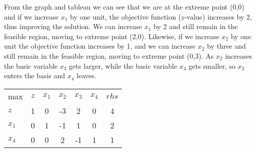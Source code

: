 From the graph and tableau we can see that we are at the extreme point (0,0) and if we increase $x_1$ by one unit, the objective function ($z$-value) increases by 2, thus improving the solution.  We can increase $x_1$ by 2 and still remain in the feasible region, moving to extreme point (2,0).  Likewise, if we increase $x_2$ by one unit the objective function increases by 1, and we can increase $x_2$ by three and still remain in the feasible region, moving to extreme point (0,3).  As $x_2$ increases the basic variable $x_3$ gets larger, while the basic variable $x_4$ gets smaller, so $x_2$ enters the basis and $x_4$ leaves.\vspace{20mm}


\begin{minipage}[t][][b]{.50\linewidth} \vspace{2mm}
\begin{center} \begin{tabular} {l|c||c|c|c|c|c|}  \cline{2-7}
max 	& $z$	& $x_1$ & $x_2$  & $x_3$	& $x_4$	& $rhs$ \\ \cline{2-7}
$z$	    & 1		& 0     & -3     &	 2 	&	  0	&   4    \\ \cline{2-7}
$x_1$	& 0		& 1     & -1     &	 1 	&	  0 &	2   \\
$x_4$	& 0		& 0     &  2    &	-1 	&	  1 &	1   \\ \cline{2-7}
\end{tabular} \end{center}
\end{minipage}%
\begin{minipage}[t][][b]{.50\linewidth}
\begin{center}   \end{center} 
\end{minipage}
~\vspace{30mm}

